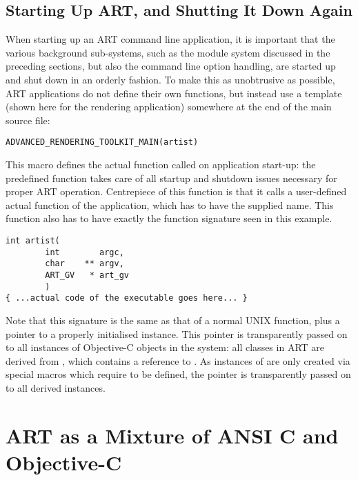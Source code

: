 \subsection{Starting Up ART, and Shutting It Down Again}

When starting up an ART command line application, it is important that the various background sub-systems, such as the module system discussed in the preceding sections, but also the command line option handling, are started up and shut down in an orderly fashion. To make this as unobtrusive as possible, ART applications do not define their own  functions, but instead use a template (shown here for the  rendering application) somewhere at the end of the main source file:

\begin{verbatim}
ADVANCED_RENDERING_TOOLKIT_MAIN(artist)
\end{verbatim}

This macro defines the actual  function called on application start-up: the predefined function takes care of all startup and shutdown issues necessary for proper ART operation. Centrepiece of this function is that it calls a user-defined actual  function of the application, which has to have the supplied name. This function also has to have exactly the function signature seen in this example.

\begin{verbatim}
int artist(
        int        argc,
        char    ** argv,
        ART_GV   * art_gv
        )
{ ...actual code of the executable goes here... }
\end{verbatim}

Note that this signature is the same as that of a normal UNIX  function, plus a pointer to a properly initialised  instance. This pointer is transparently passed on to all instances of Objective-C objects in the system: all classes in ART are derived from , which contains a reference to . As instances of  are only created via special macros which require  to be defined, the pointer is transparently passed on to all derived instances.

\section{ART as a Mixture of ANSI C and Objective-C}
\label{sect:mixingCandC}

